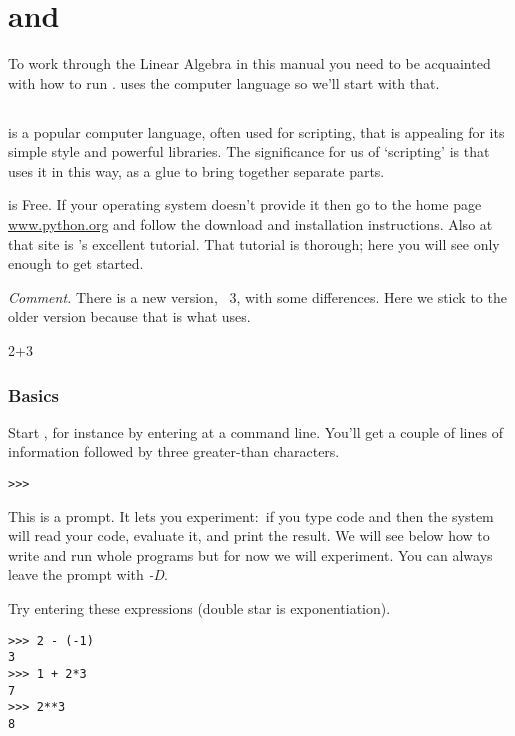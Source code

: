 \chapter{\python{} and \Sage{}}

To work through the Linear Algebra in this manual
you need to be acquainted with how to run \Sage. 
\Sage{} uses the computer language \python{} so we'll start with that.


\section{\python}
\python{} is a popular computer language, often used for scripting,
that is appealing for its simple style and powerful libraries.
The significance for us of `scripting' is that \Sage{} uses it in this way,
as a glue to bring together separate parts.

\python{} is Free.
If your operating system doesn't provide it then go to the home 
page \href{http://www.python.org}{\url{www.python.org}} and follow the
download and installation instructions.
Also at that site is \python's excellent tutorial.
That tutorial is thorough; 
here you will see only enough \python{} to get started.

\smallskip
\textit{Comment.}
There is a new version, \python~3, with some differences.
Here we stick to the older version 
because that is what \Sage{} uses.
\begin{pythonoutput}
2+3  
\end{pythonoutput}

\subsection{Basics}
Start \python, for instance by entering 
at a command line.
You'll get a couple of lines of 
information followed by three greater-than
characters.
\begin{lstlisting}[style=python]
>>>   
\end{lstlisting}
This is a prompt.
It lets you experiment:~if you type 
\python{} code and  then the system
will read your code, evaluate it, and print the result.
We will see below how to write and run whole programs
but for now we will experiment.
You can always leave the prompt with \textit{-D}.

Try entering these expressions (double star is exponentiation).
\begin{lstlisting}[style=python]
>>> 2 - (-1)
3
>>> 1 + 2*3
7
>>> 2**3
8  
\end{lstlisting}

